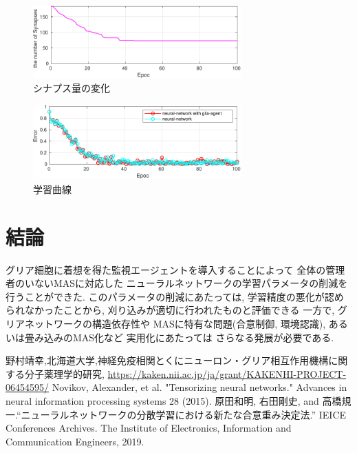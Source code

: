 \documentclass[a4paper,9pt,twocolumn]{jsarticle}
\begin{document}
\vspace{-2zh}
\begin{figure}[H]
  \centering
  \includegraphics[width=8cm]{SynapseNum-crop.pdf} 
  \caption{シナプス量の変化}
  \label{fig:SynapseNum}
\end{figure}
\vspace{-2zh}
\begin{figure}[H]
  \centering
  \includegraphics[width=8cm]{LearningCurve-crop.pdf} 
  \caption{学習曲線}
  \label{fig:LearningCurve}
\end{figure}
 
\section{結論}
グリア細胞に着想を得た監視エージェントを導入することによって
全体の管理者のいないMASに対応した
ニューラルネットワークの学習パラメータの削減を行うことができた.
このパラメータの削減にあたっては, 学習精度の悪化が認められなかったことから, 
刈り込みが適切に行われたものと評価できる
一方で, グリアネットワークの構造依存性や
MASに特有な問題(合意制御, 環境認識), あるいは畳み込みのMAS化など
実用化にあたっては
さらなる発展が必要である.
 \begin{thebibliography}{99}
野村靖幸,北海道大学,神経免疫相関とくにニューロン・グリア相互作用機構に関する分子薬理学的研究, \url{https://kaken.nii.ac.jp/ja/grant/KAKENHI-PROJECT-06454595/}
  Novikov, Alexander, et al. "Tensorizing neural networks." Advances in neural information processing systems 28 (2015).
  原田和明, 右田剛史, and 高橋規一.``ニューラルネットワークの分散学習における新たな合意重み決定法.'' IEICE Conferences Archives. The Institute of Electronics, Information and Communication Engineers, 2019.
\end{thebibliography}
 
\end{document}
